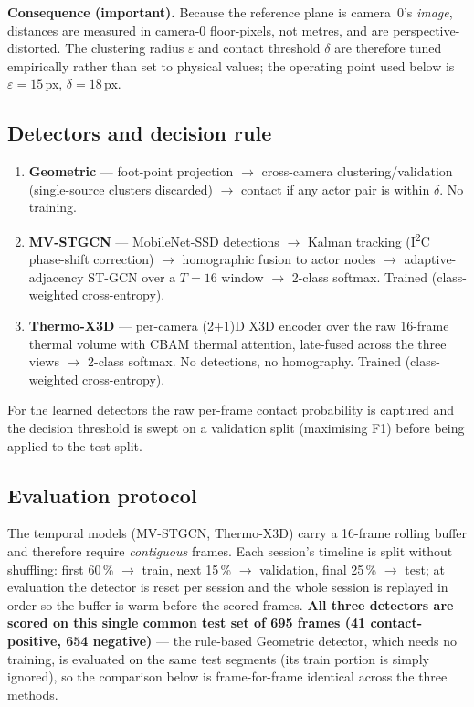 \documentclass[11pt, a4paper]{article}
\begin{document}
\textbf{Consequence (important).} Because the reference plane is camera~0's
\emph{image}, distances are measured in camera-0 floor-pixels, not metres, and
are perspective-distorted. The clustering radius $\varepsilon$ and contact
threshold $\delta$ are therefore tuned empirically rather than set to physical
values; the operating point used below is $\varepsilon=15$\,px, $\delta=18$\,px.

\subsection{Detectors and decision rule}
\begin{enumerate}[leftmargin=2em]
    \item \textbf{Geometric} --- foot-point projection $\to$ cross-camera
          clustering/validation (single-source clusters discarded) $\to$ contact
          if any actor pair is within $\delta$. No training.
    \item \textbf{MV-STGCN} --- MobileNet-SSD detections $\to$ Kalman tracking
          (I\textsuperscript{2}C phase-shift correction) $\to$ homographic fusion
          to actor nodes $\to$ adaptive-adjacency ST-GCN over a $T=16$ window
          $\to$ 2-class softmax. Trained (class-weighted cross-entropy).
    \item \textbf{Thermo-X3D} --- per-camera (2+1)D X3D encoder over the raw
          16-frame thermal volume with CBAM thermal attention, late-fused across
          the three views $\to$ 2-class softmax. No detections, no homography.
          Trained (class-weighted cross-entropy).
\end{enumerate}
For the learned detectors the raw per-frame contact probability is captured and
the decision threshold is swept on a validation split (maximising F1) before
being applied to the test split.

\subsection{Evaluation protocol}
\label{sec:protocol}
The temporal models (MV-STGCN, Thermo-X3D) carry a 16-frame rolling buffer and
therefore require \emph{contiguous} frames. Each session's timeline is split
without shuffling: first 60\,\% $\to$ train, next 15\,\% $\to$ validation,
final 25\,\% $\to$ test; at evaluation the detector is reset per session and the
whole session is replayed in order so the buffer is warm before the scored
frames. \textbf{All three detectors are scored on this single common test set
of 695 frames (41 contact-positive, 654 negative)} --- the rule-based Geometric
detector, which needs no training, is evaluated on the same test segments
(its train portion is simply ignored), so the comparison below is
frame-for-frame identical across the three methods.
\end{document}

